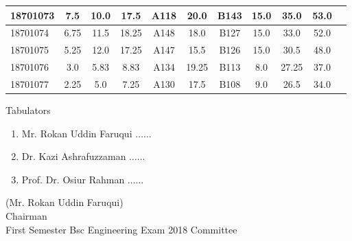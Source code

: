 \documentclass[12pt]{article}
\begin{document}
\begin{center}
\begin{small}
\begin{tabular}{|l|c|c|c|c|c|c|c|c|c|c|}
18701073 & 7.5 & 10.0 & 17.5 & A118 & 20.0 & B143 & 15.0 & 35.0 & 53.0\\ \hline 
18701074 & 6.75 & 11.5 & 18.25 & A148 & 18.0 & B127 & 15.0 & 33.0 & 52.0\\ \hline 
18701075 & 5.25 & 12.0 & 17.25 & A147 & 15.5 & B126 & 15.0 & 30.5 & 48.0\\ \hline 
18701076 & 3.0 & 5.83 & 8.83 & A134 & 19.25 & B113 & 8.0 & 27.25 & 37.0\\ \hline 
18701077 & 2.25 & 5.0 & 7.25 & A130 & 17.5 & B108 & 9.0 & 26.5 & 34.0\\ \hline 
        \end{tabular}
            \end{small}
            \end{center}
  \centering
            
            \begin{table}[hb]
            	\centering
            \begin{minipage}[b]{0.5\linewidth} %
            {\centering Tabulators }
            \begin{enumerate}
                \item Mr. Rokan Uddin Faruqui \hspace*{1ex} $\ldots \ldots  $  
                \item Dr. Kazi Ashrafuzzaman \hspace*{1ex} $\ldots \ldots  $  
                \item Prof. Dr. Osiur Rahman \hspace*{1ex} $\ldots \ldots $  
            \end{enumerate} 

            \end{minipage}
            \hspace*{1.2cm}
            \begin{minipage}[b]{0.4\linewidth} \centering
            (Mr. Rokan Uddin Faruqui) \\
            Chairman  \hspace*{1ex} \\
           First Semester Bsc Engineering Exam 2018 Committee
            \end{minipage}
            \end{table}
            \clearpage
            \clearpage
            
\end{document}
